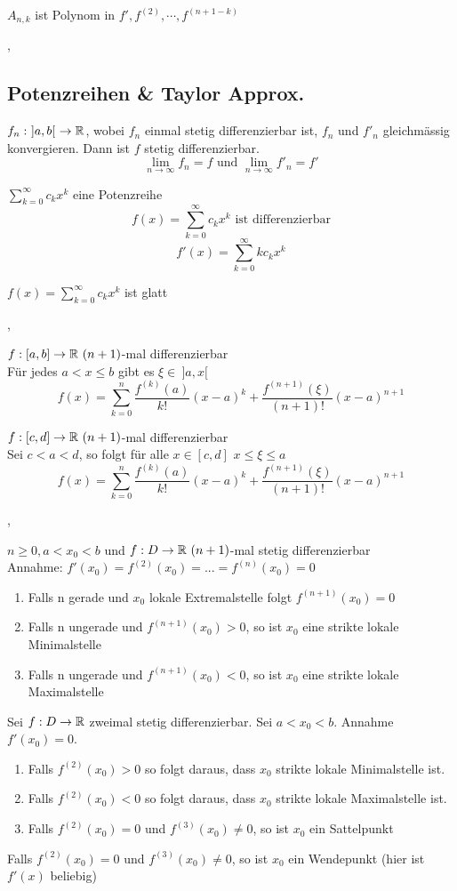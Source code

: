 \Bem $A_{n, k}$ ist Polynom in $f', f^{(2)}, \cdots , f^{(n + 1 - k)}$

\sep

\subsection{Potenzreihen \& Taylor Approx.}

\Satz[4.4.1] $f_n : \ ]a, b[ \ \rightarrow \mathbb{R}$, wobei $f_n$ einmal stetig differenzierbar ist, $f_n$ und $f'_n$ gleichmässig konvergieren. Dann ist $f$ stetig differenzierbar.
\[ \lim\limits_{n \rightarrow \infty} f_n = f \text{ und } \lim\limits_{n \rightarrow \infty} f'_n = f' \]

\Satz[4.4.2] $ \sum_{k= 0}^\infty c_k x^k$ eine Potenzreihe
\[ f(x) = \sum_{k= 0}^\infty c_k x^k \text{ ist differenzierbar} \]
\[f'(x) = \sum_{k= 0}^\infty k c_k x^k\]

\Korollar[4.4.3] $f(x) = \sum_{k= 0}^\infty c_k x^k$ ist glatt 

\sep

\Satz[4.4.5] $f : [a,b] \rightarrow \mathbb{R} \ (n + 1)$-mal differenzierbar \\
Für jedes $a < x \leq b$ gibt es $\xi \in \ ]a,x[ \ $
\[ f(x) = \sum_{k=0}^n \frac{f^{(k)}(a)}{k!} (x-a)^k  + \frac{f^{(n + 1)}(\xi)}{(n + 1)!} (x - a)^{n + 1} \]

\Korollar[4.4.6] $f : [c,d] \rightarrow \mathbb{R} \ (n + 1)$-mal differenzierbar \\
Sei $c < a < d$, so folgt für alle $x \in [c,d]$ $x \leq \xi \leq a$
\[ f(x) = \sum_{k=0}^n \frac{f^{(k)}(a)}{k!} (x-a)^k  + \frac{f^{(n + 1)}(\xi)}{(n + 1)!} (x - a)^{n + 1} \]

\sep

\Korollar[4.4.7] $n \geq 0, a < x_0 < b$ und $f : D \rightarrow \mathbb{R} \ (n + 1)$-mal stetig differenzierbar \\
Annahme: $f'(x_0) = f^{(2)}(x_0) = \text{...} = f^{(n)} (x_0) = 0$
\begin{enumerate}
\item Falls n gerade und $x_0$ lokale Extremalstelle folgt $f^{(n + 1)}(x_0) = 0$
\item Falls n ungerade und $f^{(n + 1)}(x_0)  > 0$, so ist $x_0$ eine strikte lokale Minimalstelle
\item Falls n ungerade und $f^{(n + 1)}(x_0)  < 0$, so ist $x_0$ eine strikte lokale Maximalstelle
\end{enumerate}

\Korollar[4.4.8] Sei $f : D \rightarrow \mathbb{R}$ zweimal stetig differenzierbar. Sei $ a < x_0 < b $. Annahme $f'(x_0) = 0$.
\begin{enumerate}
\item Falls $f^{(2)}(x_0) > 0$ so folgt daraus, dass $x_0$ strikte lokale Minimalstelle ist.
\item Falls $f^{(2)}(x_0) < 0$ so folgt daraus, dass $x_0$ strikte lokale Maximalstelle ist.
\item Falls $f^{(2)}(x_0) = 0$ und $f^{(3)}(x_0) \neq 0$, so ist $x_0$ ein Sattelpunkt
\end{enumerate}

\Bem Falls $f^{(2)}(x_0) = 0$ und $f^{(3)}(x_0) \neq 0$, so ist $x_0$ ein Wendepunkt (hier ist $f'(x)$ beliebig)